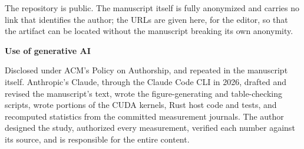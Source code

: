 \documentclass[11pt,a4paper]{article}
\begin{document}
\vspace{0.4em}
The repository is public. The manuscript itself is fully anonymized and
carries no link that identifies the author; the URLs are given here, for the
editor, so that the artifact can be located without the manuscript breaking
its own anonymity.

\vspace{2em}
{\bfseries Use of generative AI}

\vspace{0.5em}
Disclosed under ACM's Policy on Authorship, and repeated in the manuscript
itself. Anthropic's Claude, through the Claude Code CLI in 2026, drafted and
revised the manuscript's text, wrote the figure-generating and table-checking
scripts, wrote portions of the CUDA kernels, Rust host code and tests, and
recomputed statistics from the committed measurement journals. The author
designed the study, authorized every measurement, verified each number
against its source, and is responsible for the entire content.
\end{document}
